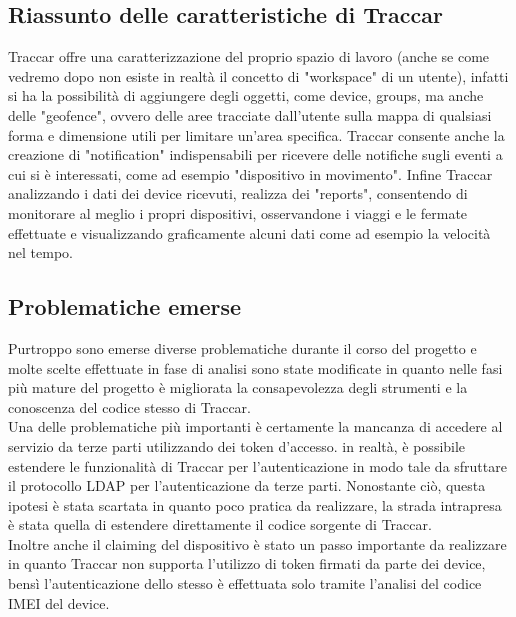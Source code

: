 \documentclass[a4paper,titlepage,12pt]{report}
\begin{document}
{\subsection{
Riassunto delle caratteristiche di Traccar}
Traccar offre una caratterizzazione del proprio spazio di lavoro (anche se come vedremo dopo non esiste in realtà il concetto di "workspace" di un utente), infatti si ha la possibilità di aggiungere degli oggetti, come device, groups, ma anche delle "geofence", ovvero delle aree tracciate dall'utente sulla mappa di qualsiasi forma e dimensione utili per limitare un'area specifica. Traccar consente anche la creazione di "notification" indispensabili per ricevere delle notifiche sugli eventi a cui si è interessati, come ad esempio "dispositivo in movimento". Infine Traccar analizzando i dati dei device ricevuti, realizza dei "reports", consentendo di monitorare al meglio i propri dispositivi, osservandone i viaggi e le fermate effettuate e visualizzando graficamente alcuni dati come ad esempio la velocità nel tempo.

\subsection{
Problematiche emerse}
Purtroppo sono emerse diverse problematiche durante il corso del progetto e molte scelte effettuate in fase di analisi sono state modificate in quanto nelle fasi più mature del progetto è migliorata la consapevolezza degli strumenti e la conoscenza del codice stesso di Traccar. \\
Una delle problematiche più importanti è certamente la mancanza di accedere al servizio da terze parti utilizzando dei token d'accesso. in realtà, è possibile estendere le funzionalità di Traccar per l'autenticazione in modo tale da sfruttare il protocollo LDAP per l'autenticazione da terze parti. Nonostante ciò, questa ipotesi è stata scartata in quanto poco pratica da realizzare, la strada intrapresa è stata quella di estendere direttamente il codice sorgente di Traccar.\\
Inoltre anche il claiming del dispositivo è stato un passo importante da realizzare in quanto Traccar non supporta l'utilizzo di token firmati da parte dei device, bensì l'autenticazione dello stesso è effettuata solo tramite l'analisi del codice IMEI del device.


}
\end{document}
